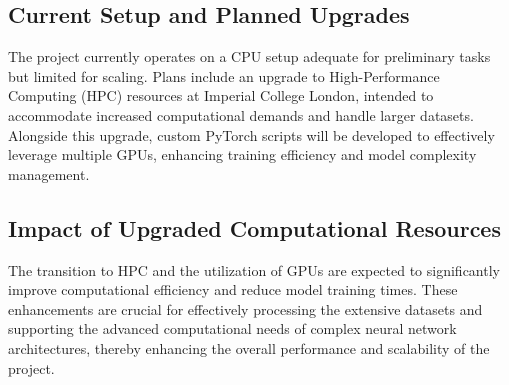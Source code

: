\thesisspacing %

\subsection{Current Setup and Planned Upgrades}
The project currently operates on a CPU setup adequate for preliminary tasks but limited for scaling. Plans include an upgrade to High-Performance Computing (HPC) resources at Imperial College London, intended to accommodate increased computational demands and handle larger datasets. Alongside this upgrade, custom PyTorch scripts will be developed to effectively leverage multiple GPUs, enhancing training efficiency and model complexity management.

\subsection{Impact of Upgraded Computational Resources}
The transition to HPC and the utilization of GPUs are expected to significantly improve computational efficiency and reduce model training times. These enhancements are crucial for effectively processing the extensive datasets and supporting the advanced computational needs of complex neural network architectures, thereby enhancing the overall performance and scalability of the project.
